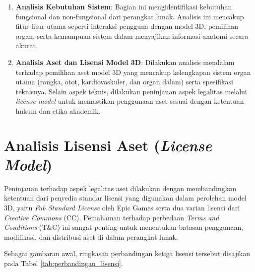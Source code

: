 \begin{enumerate}
    \item \textbf{Analisis Kebutuhan Sistem}: Bagian ini mengidentifikasi kebutuhan fungsional dan non-fungsional dari perangkat lunak. Analisis ini mencakup fitur-fitur utama seperti interaksi pengguna dengan model 3D, pemilihan organ, serta kemampuan sistem dalam menyajikan informasi anatomi secara akurat.
    
    \item \textbf{Analisis Aset dan Lisensi Model 3D}: Dilakukan analisis mendalam terhadap pemilihan aset model 3D yang mencakup kelengkapan sistem organ utama (rangka, otot, kardiovaskuler, dan organ dalam) serta spesifikasi teknisnya. Selain aspek teknis, dilakukan peninjauan aspek legalitas melalui \textit{license model} untuk memastikan penggunaan aset sesuai dengan ketentuan hukum dan etika akademik.
\end{enumerate}

\section[Analisis Lisensi Aset (License Model)]{Analisis Lisensi Aset (\textit{License Model})}
\label{subsec:analisis_lisensi}

Peninjauan terhadap aspek legalitas aset dilakukan dengan membandingkan ketentuan dari penyedia standar lisensi yang digunakan dalam perolehan model 3D, yaitu \textit{Fab Standard License} oleh Epic Games serta dua varian lisensi dari \textit{Creative Commons} (CC). Pemahaman terhadap perbedaan \textit{Terms and Conditions} (T\&C) ini sangat penting untuk menentukan batasan penggunaan, modifikasi, dan distribusi aset di dalam perangkat lunak.

Sebagai gambaran awal, ringkasan perbandingan ketiga lisensi tersebut disajikan pada Tabel \ref{tab:perbandingan_lisensi}.

